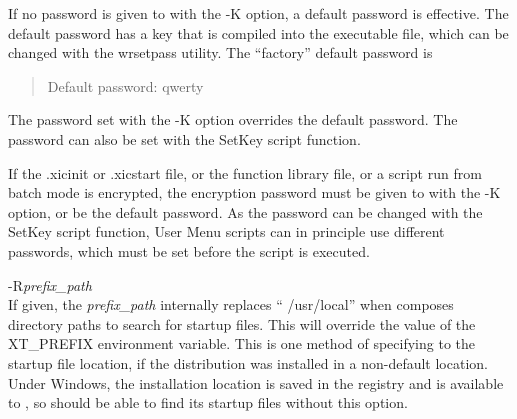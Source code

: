 \begin{description}
If no password is given to {\Xic} with the {\vt -K} option, a default
password is effective.  The default password has a key that is
compiled into the executable file, which can be changed with the {\vt
wrsetpass} utility.  The ``factory'' default password is
\begin{quote}
{\cb Default password}: {\vt qwerty}
\end{quote}
The password set with the {\vt -K} option overrides the default
password.  The password can also be set with the {\vt SetKey} script
function.

If the {\vt .xicinit} or {\vt .xicstart} file, or the function library
file, or a script run from batch mode is encrypted, the encryption
password must be given to {\Xic} with the {\vt -K} option, or be the
default password.  As the password can be changed with the {\vt
SetKey} script function, {\cb User Menu} scripts can in principle use
different passwords, which must be set before the script is executed.

%

\item{\et -R}{\it prefix\_path}\\
If given, the {\it prefix\_path} internally replaces ``{\vt
/usr/local}'' when {\Xic} composes directory paths to search for
startup files.  This will override the value of the {\et XT\_PREFIX}
environment variable.  This is one method of specifying to {\Xic} the
startup file location, if the distribution was installed in a
non-default location.  Under Windows, the installation location is
saved in the registry and is available to {\Xic}, so {\Xic} should be
able to find its startup files without this option.


\end{description}
